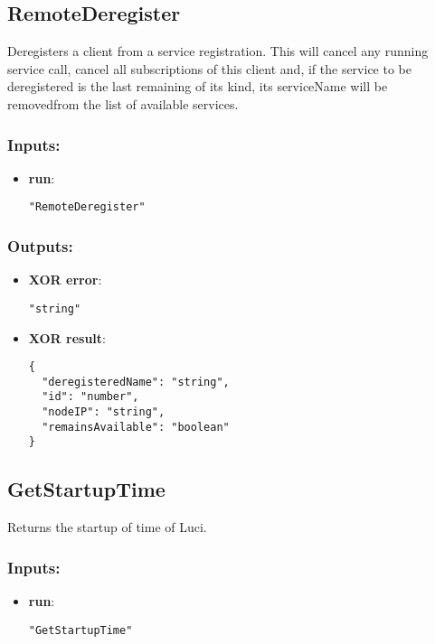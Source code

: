 \subsection{RemoteDeregister}
Deregisters
 a client from a service registration. This will cancel any running 
service call, cancel all subscriptions of this client and, if the 
service to be deregistered is the last remaining of its kind, its 
serviceName will be removedfrom the list of available services.
\subsubsection*{Inputs:}
\begin{itemize}
    \item \textbf{run}: 
\begin{lstlisting}
"RemoteDeregister"
\end{lstlisting}
  \end{itemize}

\subsubsection*{Outputs:}
\begin{itemize}
    \item \textbf{XOR error}: 
\begin{lstlisting}
"string"
\end{lstlisting}
    \item \textbf{XOR result}: 
\begin{lstlisting}
{
  "deregisteredName": "string", 
  "id": "number", 
  "nodeIP": "string", 
  "remainsAvailable": "boolean"
}
\end{lstlisting}
  \end{itemize}

\subsection{GetStartupTime}
Returns the startup of time of Luci.
\subsubsection*{Inputs:}
\begin{itemize}
    \item \textbf{run}: 
\begin{lstlisting}
"GetStartupTime"
\end{lstlisting}
  \end{itemize}

